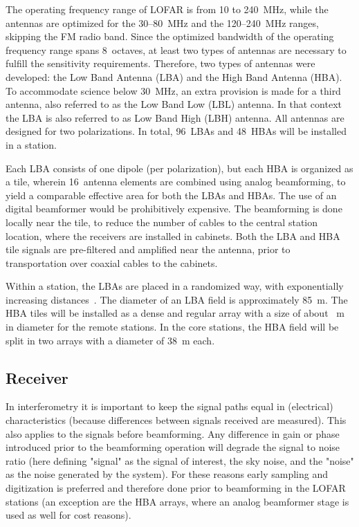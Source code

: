 \documentclass[journal]{IEEEtran}
\begin{document}
The operating frequency range of LOFAR is from 10 to 240~MHz, while the
antennas are optimized for the 30--80~MHz and the 120--240~MHz ranges,
skipping the FM radio band.
Since the optimized bandwidth of the operating frequency range spans 8~octaves,
at least two types of antennas are necessary to fulfill the sensitivity
requirements.
Therefore, two types of antennas were developed: the Low Band Antenna (LBA) and the High Band Antenna (HBA).
To accommodate science below 30~MHz, an extra provision is made for a
third antenna, also referred to as the Low Band Low (LBL) antenna.
In that context the LBA is also referred to as Low Band High (LBH) antenna.
All antennas are designed for two polarizations.
In total, 96~LBAs and 48~HBAs will be installed in a station. 

Each LBA consists of one dipole (per polarization), but
each HBA is organized as a tile, wherein 16~antenna elements are combined using
analog beamforming, to yield a comparable effective area for both the LBAs and
HBAs.
The use of an digital beamformer would be prohibitively expensive.
The beamforming is done locally near the tile, to reduce the number of cables
to the central station location, where the receivers are installed in cabinets.
Both the LBA and HBA tile signals are pre-filtered and amplified near the
antenna, prior to transportation over coaxial cables to the cabinets.

Within a station, the LBAs are placed in a randomized way, with exponentially
increasing distances~\cite{capp:06}.
The diameter of an LBA field is approximately 85~m.
The HBA tiles will be installed as a dense and regular array with a size of
about ~m in diameter for the remote stations.
In the core stations, the HBA field will be split in two arrays with a diameter
of 38~m each. 

\subsection{Receiver}

In interferometry it is important to keep the signal paths equal in (electrical) characteristics (because differences between signals received are measured). This also applies to the signals before beamforming. Any difference in gain or phase introduced prior to the beamforming operation will degrade the signal to noise ratio (here defining "signal" as the signal of interest, the sky noise, and the "noise" as the noise generated by the system). For these reasons early sampling and digitization is preferred and therefore done prior to beamforming in the LOFAR stations (an exception are the HBA arrays, where an analog beamformer stage is used as well for cost reasons). 
\end{document}
